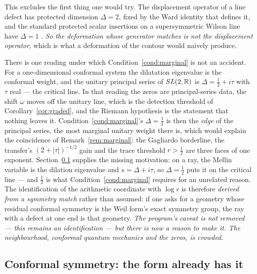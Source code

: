 This excludes the first thing one would try. The displacement operator of a line
defect has protected dimension $\Delta=2$, fixed by the Ward identity that defines
it, and the standard protected scalar insertions on a supersymmetric Wilson line
have $\Delta=1$ \cite{GiombiKomatsu,CHMS}. \emph{So the deformation whose
generator matches is not the displacement operator}, which is what a deformation
of the contour would naively produce.

\begin{remark}
\label{rem:principal}
There is one reading under which Condition~\ref{cond:marginal} is not an accident.
For a one-dimensional conformal system the dilatation eigenvalue is the conformal
weight, and the unitary principal series of $SL(2,\mathbb R)$ is $\Delta=\frac12+i\tau$
with $\tau$ real --- the critical line. In that reading the zeros are
principal-series data, the shift $\omega$ moves off the unitary line, which is the
detection threshold of Corollary~\ref{cor:graded}, and the Riemann hypothesis is
the statement that nothing leaves it. Condition~\ref{cond:marginal}'s
$\Delta=\frac12$ is then the \emph{edge} of the principal series, the most
marginal unitary weight there is, which would explain the coincidence of
Remark~\ref{rem:marginal}: the Gagliardo borderline, the transfer's
$(2+|\tau|)^{-1/2}$ gain and the trace threshold $r>\frac12$ are three faces of
one exponent. Section~\ref{subsec:conformal} supplies the missing motivation: on a ray, the
Mellin variable is the dilation eigenvalue and $s=\Delta+i\tau$, so
$\Delta=\frac12$ puts it on the critical line --- and $\frac12$ is what
Condition~\ref{cond:marginal} requires for an unrelated reason. The identification
of the arithmetic coordinate with $\log r$ is therefore \emph{derived from a
symmetry match} rather than assumed: if one asks for a geometry whose residual
conformal symmetry is the Weil form's exact symmetry group, the ray with a defect
at one end is that geometry. \emph{The program's caveat is not removed --- this
remains an identification --- but there is now a reason to make it. The
neighbourhood, conformal quantum mechanics and the zeros, is crowded.}
\end{remark}

\subsection{Conformal symmetry: the form already has it}\label{subsec:conformal}

